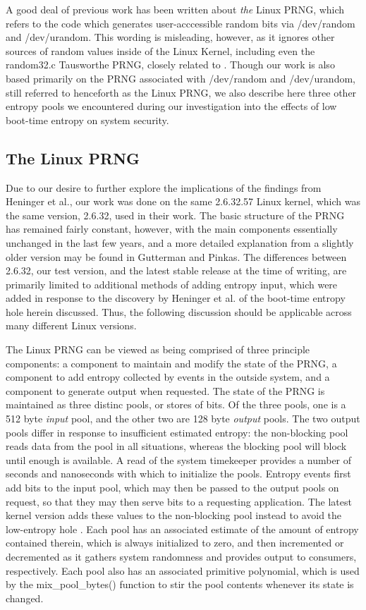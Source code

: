 A good deal of previous work has been written about \textit{the} Linux PRNG, which refers to the code which generates user-acccessible random bits via /dev/random and /dev/urandom\cite{linuxPRNG, revisited, viega, pnqs, kmowery, random4}.  This wording is misleading, however, as it ignores other sources of random values inside of the Linux Kernel, including even the random32.c Tausworthe PRNG, closely related to \cite{random3}\cite{tausworthe}.   Though our work is also based primarily on the PRNG associated with /dev/random and /dev/urandom, still referred to henceforth as the Linux PRNG, we also describe here three other entropy pools we encountered during our investigation into the effects of low boot-time entropy on system security.

\subsection{The Linux PRNG}
Due to our desire to further explore the implications of the findings from Heninger et al., our work was done on the same 2.6.32.57 Linux kernel, which was the same version, 2.6.32, used in their work.  The basic structure of the PRNG has remained fairly constant, however, with the main components essentially unchanged in the last few years, and a more detailed explanation from a slightly older version may be found in Gutterman and Pinkas\cite{linuxPRNG}.  The differences between 2.6.32, our test version, and the latest stable release at the time of writing, are primarily limited to additional methods of adding entropy input, which were added in response to the discovery by Heninger et al. of the boot-time entropy hole herein discussed. Thus, the following discussion should be applicable across many different Linux versions. 

The Linux PRNG can be viewed as being comprised of three principle components: a component to maintain and modify the state of the PRNG, a component to add entropy collected by events in the outside system,  and a component to generate output when requested.  The state of the PRNG is maintained as three distinc pools, or stores of bits.  Of the three pools, one is a 512 byte \textit{input} pool, and the other two are 128 byte \textit{output} pools.  The two output pools differ in response to insufficient estimated entropy: the non-blocking pool reads data from the pool in all situations, whereas the blocking pool will block until enough is available.  A read of the system timekeeper provides a number of seconds and nanoseconds with which to initialize the pools.  Entropy events first add bits to the input pool, which may then be passed to the output pools on request, so that they may then serve bits to a requesting application.  The latest kernel version adds these values to the non-blocking pool instead to avoid the low-entropy hole \cite{kmowery}. Each pool has an associated estimate of the amount of entropy contained therein, which is always initialized to zero, and then incremented or decremented as it gathers system randomness and provides output to consumers, respectively.  Each pool also has an associated primitive polynomial, which is used by the mix\_pool\_bytes() function to stir the pool contents whenever its state is changed.  

